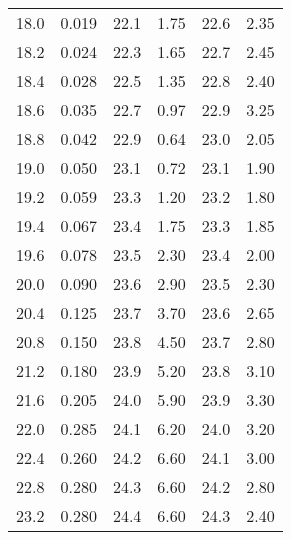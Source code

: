 \begin{longtable}{S[table-format=3.2] S[table-format=3.2] S[table-format=3.2] S[table-format=3.2] S[table-format=3.2] S[table-format=3.2]}
          18.0   &   0.019  &     22.1    &  1.75   & 22.6   &   2.35                                      \\
          18.2   &   0.024  &     22.3    &  1.65   & 22.7   &   2.45                                      \\
          18.4   &   0.028  &     22.5    &  1.35   & 22.8   &   2.40                                      \\
          18.6   &   0.035  &     22.7    &  0.97   & 22.9   &   3.25                                      \\
          18.8   &   0.042  &     22.9    &  0.64   & 23.0   &   2.05                                      \\
          19.0   &   0.050  &     23.1    &  0.72   & 23.1   &   1.90                                      \\
          19.2   &   0.059  &     23.3    &  1.20   & 23.2   &   1.80                                      \\
          19.4   &   0.067  &     23.4    &  1.75   & 23.3   &   1.85                                      \\
          19.6   &   0.078  &     23.5    &  2.30   & 23.4   &   2.00                                      \\
          20.0   &   0.090  &     23.6    &  2.90   & 23.5   &   2.30                                      \\
          20.4   &   0.125  &     23.7    &  3.70   & 23.6   &   2.65                                      \\
          20.8   &   0.150  &     23.8    &  4.50   & 23.7   &   2.80                                      \\
          21.2   &   0.180  &     23.9    &  5.20   & 23.8   &   3.10                                      \\
          21.6   &   0.205  &     24.0    &  5.90   & 23.9   &   3.30                                      \\
          22.0   &   0.285  &     24.1    &  6.20   & 24.0   &   3.20                                      \\
          22.4   &   0.260  &     24.2    &  6.60   & 24.1   &   3.00                                      \\
          22.8   &   0.280  &     24.3    &  6.60   & 24.2   &   2.80                                      \\
          23.2   &   0.280  &     24.4    &  6.60   & 24.3   &   2.40                                      \\

\end{longtable}
